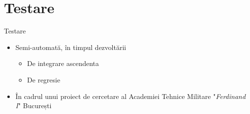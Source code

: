\section{Testare}

\begin{frame}{Testare} \pause
	\begin{itemize}
		\item Semi-automată, în timpul dezvoltării \pause
		    \begin{itemize}
		        \item De integrare ascendenta \pause
		        \item De regresie \pause
		    \end{itemize}
        \item În cadrul unui proiect de cercetare al Academiei Tehnice Militare "\textit{Ferdinand I}" București
	\end{itemize}
\end{frame}